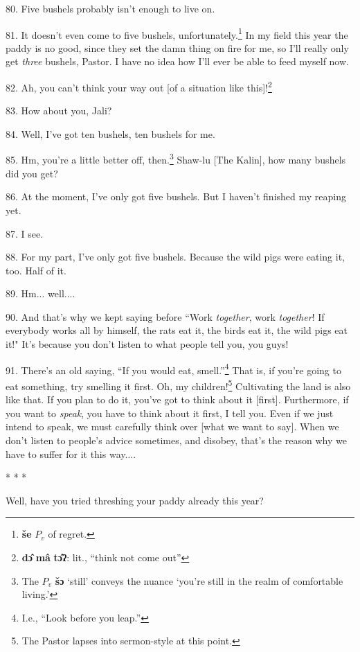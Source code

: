 80. Five bushels probably isn't enough to live on.

81. It doesn't even come to five bushels, unfortunately.\footnote{\textbf{še} $P_v$ of regret.} In my field this year
the paddy is no good, since they set the damn thing on fire for me, so I'll really
only get \textit{three} bushels, Pastor. I have no idea how I'll ever be able to
feed myself now.

82. Ah, you can't think your way out [of a situation like this]!\footnote{\textbf{dɔ̂} \textbf{mâ} \textbf{tɔ̂ʔ}: lit., ``think not come out''}

83. How about you, Jali?

84. Well, I've got ten bushels, ten bushels for me.

85. Hm, you're a little better off, then.\footnote{The $P_v$ \textbf{šɔ} `still' conveys the nuance `you're still in the realm of comfortable living.'} Shaw-lu [The Kalin], how many bushels
did you get?

86. At the moment, I've only got five bushels. But I haven't finished my reaping
yet.

87. I see.

88. For my part, I've only got five bushels. Because the wild pigs were eating
it, too. Half of it.

89. Hm... well....

90. And that's why we kept saying before ``Work\textit{ together}, work
\textit{together}! If everybody works all by himself, the rats eat it, the birds
eat it, the wild pigs eat it!" It's because you don't listen to what people
tell you, you guys!

91. There's an old saying, ``If you would eat, smell.''\footnote{I.e., ``Look before you leap.''} That
is, if you're going to eat something, try smelling it first. Oh, my children!\footnote{The Pastor lapses into sermon-style at this point.}
Cultivating the land is also like that. If you plan to do it, you've got to think
about it [first]. Furthermore, if you want to \textit{speak}, you have to think
about it first, I tell you. Even if we just intend to speak, we must carefully
think over [what we want to say]. When we don't listen to people's advice sometimes,
and disobey, that's the reason why we have to suffer for it this way....

\begin{center}
* * *
\end{center}

Well, have you tried threshing your paddy already this year?


